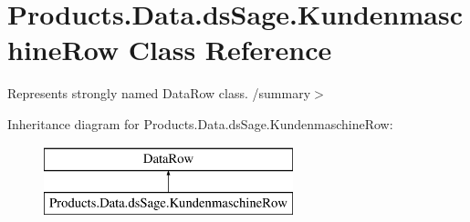 \hypertarget{class_products_1_1_data_1_1ds_sage_1_1_kundenmaschine_row}{}\section{Products.\+Data.\+ds\+Sage.\+Kundenmaschine\+Row Class Reference}
\label{class_products_1_1_data_1_1ds_sage_1_1_kundenmaschine_row}


Represents strongly named Data\+Row class. /summary$>$  


Inheritance diagram for Products.\+Data.\+ds\+Sage.\+Kundenmaschine\+Row\+:\begin{figure}[H]
\begin{center}
\leavevmode
\includegraphics[height=2.000000cm]{class_products_1_1_data_1_1ds_sage_1_1_kundenmaschine_row}
\end{center}
\end{figure}
